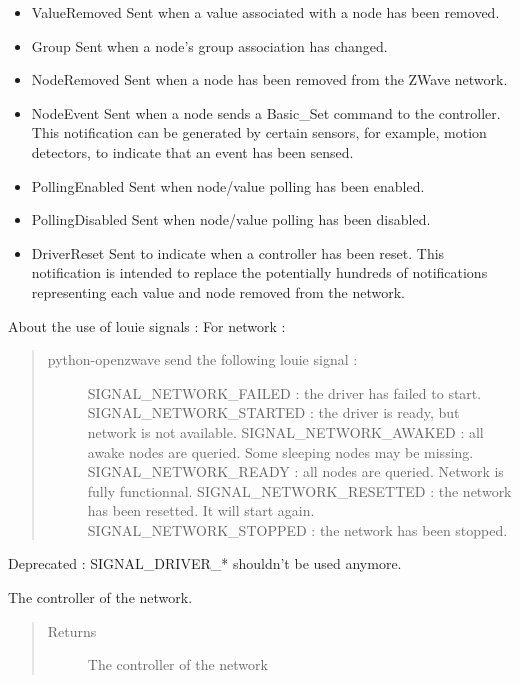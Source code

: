 \documentclass[letterpaper,10pt,english]{sphinxmanual}
\begin{document}
\begin{fulllineitems}
\begin{itemize}
\item {} 
ValueRemoved  Sent when a value associated with a node has been removed.

\item {} 
Group     Sent when a node’s group association has changed.

\item {} 
NodeRemoved   Sent when a node has been removed from the ZWave network.

\item {} 
NodeEvent     Sent when a node sends a Basic\_Set command to the controller.  This notification can be generated by certain sensors, for example, motion detectors, to indicate that an event has been sensed.

\item {} 
PollingEnabled    Sent when node/value polling has been enabled.

\item {} 
PollingDisabled   Sent when node/value polling has been disabled.

\item {} 
DriverReset   Sent to indicate when a controller has been reset.  This notification is intended to replace the potentially hundreds of notifications representing each value and node removed from the network.

\end{itemize}

About the use of louie signals :
For network :
\begin{quote}
\begin{description}
\item[{python-openzwave send the following louie signal :}] \leavevmode
SIGNAL\_NETWORK\_FAILED : the driver has failed to start.
SIGNAL\_NETWORK\_STARTED : the driver is ready, but network is not available.
SIGNAL\_NETWORK\_AWAKED : all awake nodes are queried. Some sleeping nodes may be missing.
SIGNAL\_NETWORK\_READY : all nodes are queried. Network is fully functionnal.
SIGNAL\_NETWORK\_RESETTED : the network has been resetted. It will start again.
SIGNAL\_NETWORK\_STOPPED : the network has been stopped.

\end{description}
\end{quote}

Deprecated : SIGNAL\_DRIVER\_* shouldn't be used anymore.

\begin{fulllineitems}
\label{network:openzwave.network.ZWaveNetwork.controller}
The controller of the network.
\begin{quote}\begin{description}
\item[{Returns}] \leavevmode
The controller of the network


\end{description}
\end{quote}
\end{fulllineitems}
\end{fulllineitems}
\end{document}
